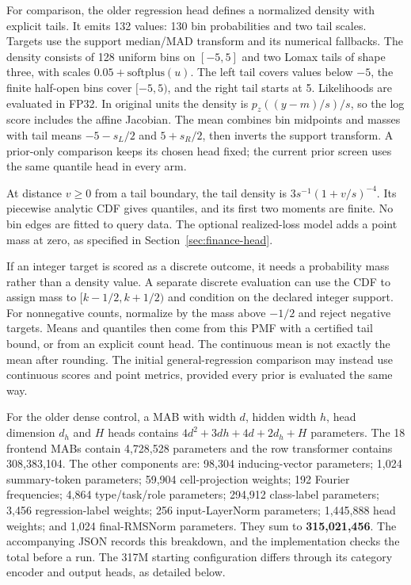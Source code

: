 \documentclass[11pt]{article}
\begin{document}
For comparison, the older regression head defines a normalized density with explicit tails. It emits 132 values: 130 bin probabilities and two tail scales. Targets use the support median/MAD transform and its numerical fallbacks. The density consists of 128 uniform bins on $[-5,5]$ and two Lomax tails of shape three, with scales $0.05+\mathrm{softplus}(u)$. The left tail covers values below $-5$, the finite half-open bins cover $[-5,5)$, and the right tail starts at 5. Likelihoods are evaluated in FP32. In original units the density is $p_z((y-m)/s)/s$, so the log score includes the affine Jacobian. The mean combines bin midpoints and masses with tail means $-5-s_L/2$ and $5+s_R/2$, then inverts the support transform. A prior-only comparison keeps its chosen head fixed; the current prior screen uses the same quantile head in every arm.

At distance $v\geq0$ from a tail boundary, the tail density is $3s^{-1}(1+v/s)^{-4}$. Its piecewise analytic CDF gives quantiles, and its first two moments are finite. No bin edges are fitted to query data. The optional realized-loss model adds a point mass at zero, as specified in Section~\ref{sec:finance-head}.

If an integer target is scored as a discrete outcome, it needs a probability mass rather than a density value. A separate discrete evaluation can use the CDF to assign mass to $[k-1/2,k+1/2)$ and condition on the declared integer support. For nonnegative counts, normalize by the mass above $-1/2$ and reject negative targets. Means and quantiles then come from this PMF with a certified tail bound, or from an explicit count head. The continuous mean is not exactly the mean after rounding. The initial general-regression comparison may instead use continuous scores and point metrics, provided every prior is evaluated the same way.

For the older dense control, a MAB with width $d$, hidden width $h$, head dimension $d_h$ and $H$ heads contains $4d^2+3dh+4d+2d_h+H$ parameters. The 18 frontend MABs contain 4,728,528 parameters and the row transformer contains 308,383,104. The other components are: 98,304 inducing-vector parameters; 1,024 summary-token parameters; 59,904 cell-projection weights; 192 Fourier frequencies; 4,864 type/task/role parameters; 294,912 class-label parameters; 3,456 regression-label weights; 256 input-LayerNorm parameters; 1,445,888 head weights; and 1,024 final-RMSNorm parameters. They sum to \textbf{315,021,456}. The accompanying JSON records this breakdown, and the implementation checks the total before a run. The 317M starting configuration differs through its category encoder and output heads, as detailed below.
\end{document}
